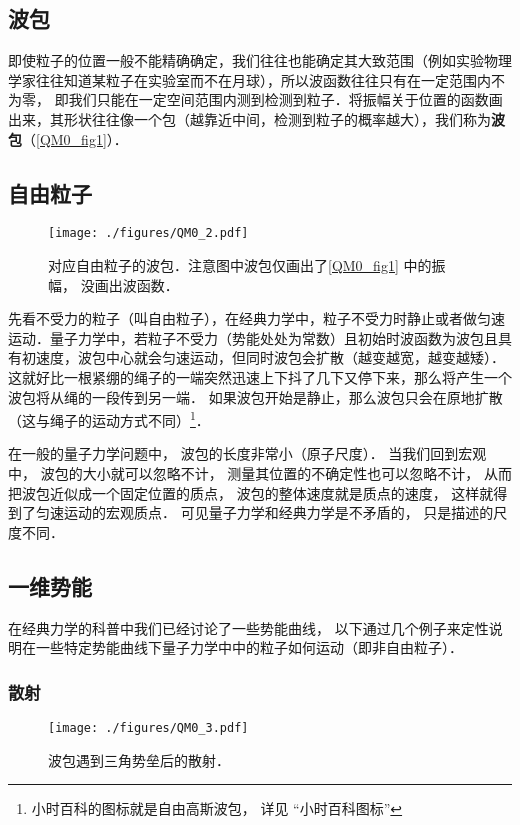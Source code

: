 \subsection{波包}
即使粒子的位置一般不能精确确定，我们往往也能确定其大致范围（例如实验物理学家往往知道某粒子在实验室而不在月球），所以波函数往往只有在一定范围内不为零， 即我们只能在一定空间范围内测到检测到粒子．将振幅关于位置的函数画出来，其形状往往像一个包（越靠近中间，检测到粒子的概率越大），我们称为\textbf{波包}（\autoref{QM0_fig1}）．

\subsection{自由粒子}

\begin{figure}[ht]
\centering
\texttt{[image: ./figures/QM0\_2.pdf]}
\caption{对应自由粒子的波包．注意图中波包仅画出了\autoref{QM0_fig1} 中的振幅， 没画出波函数．} \label{QM0_fig2}
\end{figure}

先看不受力的粒子（叫自由粒子），在经典力学中，粒子不受力时静止或者做匀速运动．量子力学中，若粒子不受力（势能处处为常数）且初始时波函数为波包且具有初速度，波包中心就会匀速运动，但同时波包会扩散（越变越宽，越变越矮）．这就好比一根紧绷的绳子的一端突然迅速上下抖了几下又停下来，那么将产生一个波包将从绳的一段传到另一端． 如果波包开始是静止，那么波包只会在原地扩散（这与绳子的运动方式不同）\footnote{小时百科的图标就是自由高斯波包， 详见 “小时百科图标”}．

在一般的量子力学问题中， 波包的长度非常小（原子尺度）． 当我们回到宏观中， 波包的大小就可以忽略不计， 测量其位置的不确定性也可以忽略不计， 从而把波包近似成一个固定位置的质点， 波包的整体速度就是质点的速度， 这样就得到了匀速运动的宏观质点． 可见量子力学和经典力学是不矛盾的， 只是描述的尺度不同．

\subsection{一维势能} 

在经典力学的科普中我们已经讨论了一些势能曲线， 以下通过几个例子来定性说明在一些特定势能曲线下量子力学中中的粒子如何运动（即非自由粒子）．

\subsubsection{散射}

\begin{figure}[ht]
\centering
\texttt{[image: ./figures/QM0\_3.pdf]}
\caption{波包遇到三角势垒后的散射．} \label{QM0_fig3} %
\end{figure}

